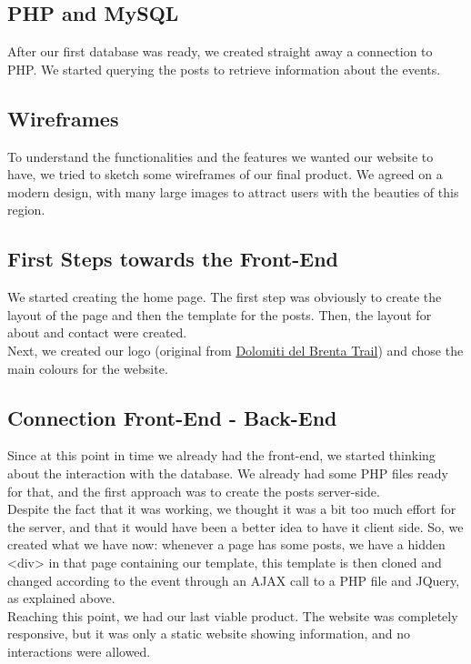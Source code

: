 \documentclass[a4paper]{article}
\begin{document}
	\subsection{PHP and MySQL}
	After our first database was ready, we created straight away a connection to PHP. We started querying the posts to retrieve information about the events.
	
	\subsection{Wireframes}
	To understand the functionalities and the features we wanted our website to have, we tried to sketch some wireframes of our final product. We agreed on a modern design, with many large images to attract users with the beauties of this region. 
	
	\subsection{First Steps towards the Front-End}
	We started creating the home page. The first step was obviously to create the layout of the page and then the template for the posts. Then, the layout for about and contact were created.\\
	Next, we created our logo (original from \href{https://goo.gl/yTRScL}{Dolomiti del Brenta Trail}) and chose the main colours for the website.
	
	\subsection{Connection Front-End - Back-End}
	Since at this point in time we already had the front-end, we started thinking about the interaction with the database. We already had some PHP files ready for that, and the first approach was to create the posts server-side.\\
	Despite the fact that it was working, we thought it was a bit too much effort for the server, and that it would have been a better idea to have it client side. So, we created what we have now: whenever a page has some posts, we have a hidden <div> in that page containing our template, this template is then cloned and changed according to the event through an AJAX call to a PHP file and JQuery, as explained above.\\
	Reaching this point, we had our last viable product. The website was completely responsive, but it was only a static website showing information, and no interactions were allowed.
\end{document}

